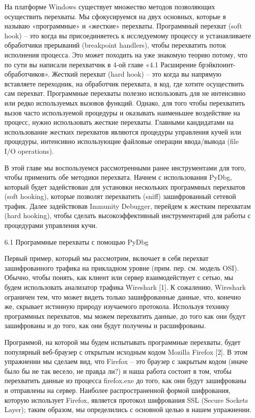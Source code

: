 \documentclass[12pt, a4paper, oneside]{book}
\begin{document}
На платформе Windows существует множество методов позволяющих осуществить перехваты. Мы сфокусируемся на двух основных, которые я называю «программные» и «жесткие» перехваты. Программный перехват (soft hook) – это когда вы присоединяетесь к исследуемому процессу и устанавливаете обработчики прерываний (breakpoint handlers), чтобы перехватить поток исполнения процесса. Это может походить на уже знакомую теорию потому, что по сути вы написали перехватчик в 4-ой главе «4.1 Расширение брэйкпоинт-обработчиков». Жесткий перехват (hard hook) – это когда вы напрямую вставляете переходник, на обработчик перехвата, в код, где хотите осуществить сам перехват. Программные перехваты полезно использовать для не интенсивно или редко используемых вызовов функций. Однако, для того чтобы перехватить вызов часто используемой процедуры и оказывать наименьшее воздействие на процесс, нужно использовать жесткие перехваты. Главными кандидатами на использование жестких перехватов являются процедуры управления кучей или процедуры, интенсивно использующие файловые операции ввода/вывода (file I/O operations).

В этой главе мы воспользуемся рассмотренными ранее инструментами для того, чтобы применить обе методики перехвата. Начнем с использования PyDbg, который будет задействован для установки нескольких программных перехватов (soft hooking), которые позволят перехватить (sniff) зашифрованный сетевой трафик. Далее задействовав Immunity Debugger, перейдем к жестким перехватам (hard hooking), чтобы сделать высокоэффективный инструментарий для работы с процедурами управления кучи. 


6.1 Программные перехваты с помощью PyDbg

Первый пример, который мы рассмотрим, включает в себя перехват зашифрованного трафика на прикладном уровне (прим. пер. см. модель OSI). Обычно, чтобы понять, как клиент или сервер взаимодействует с сетью, мы будем использовать анализатор трафика Wireshark [1]. К сожалению, Wireshark ограничен тем, что может видеть только зашифрованные данные, что, конечно же, скрывает истинную природу изучаемого протокола. Используя технику программных перехватов, мы можем перехватить данные, до того как они будут зашифрованы и до того, как они будут получены и расшифрованы. 

Программой, на которой мы будем испытывать программные перехваты, будет популярный веб-браузер с открытым исходным кодом Mozilla Firefox [2]. В этом упражнении мы сделаем вид, что Firefox – это браузер с закрытым кодом (иначе было бы не так весело, не правда ли?) и наша работа состоит в том, чтобы перехватить данные из процесса firefox.exe до того, как они будут зашифрованы и отправлены на сервер. Наиболее распространенной формой шифрования, которую использует Firefox, является протокол шифрования SSL (Secure Sockets Layer); таким образом, мы определились с основной целью в нашем упражнении. 
\end{document}
